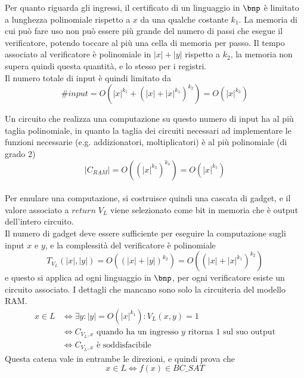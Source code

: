 Per quanto riguarda gli ingressi, il certificato di un linguaggio in $\bnp$ è limitato a lunghezza polinomiale rispetto a $x$ da una qualche costante $k_1$. La memoria di cui può fare uso non può essere più grande del numero di passi che esegue il verificatore, potendo toccare al più una cella di memoria per passo.
Il tempo associato al verificatore è polinomiale in $|x|+|y|$ rispetto a $k_2$, la memoria non supera quindi questa quantità, e lo stesso per i registri.
\\
Il numero totale di input è quindi limitato da
\begin{equation*}
    \# input =
    O \left( |x|^{k_1} + \left( |x|+|x|^{k_1} \right)^{k_2} \right)
    =
    O \left( |x|^{k_3} \right)
\end{equation*}

Un circuito che realizza una computazione su questo numero di input ha al più taglia polinomiale, in quanto la taglia dei circuiti necessari ad implementare le funzioni necessarie (e.g. addizionatori, moltiplicatori) è al più polinomiale (di grado 2)
\begin{equation*}
    |C_{RAM}| =
    O
    \left( 
        \left( |x|^{k_3} \right)^{k_4}
    \right)
    =
    O \left( |x|^{k_5} \right)
\end{equation*}
\\
Per emulare una computazione, si costruisce quindi una cascata di gadget, e il valore associato a $return \; V_L$ viene selezionato come bit in memoria che è output dell'intero circuito.
\\
Il numero di gadget deve essere sufficiente per eseguire la computazione sugli input $x$ e $y$, e la complessità del verificatore è polinomiale
\begin{equation*}
    T_{V_{L}} (|x|, |y|) = O \left( \left( |x|+|y| \right)^{k_{2}} \right) = 
    O \left( \left( |x|+|x|^{k_1} \right)^{k_2} \right)
\end{equation*}
e questo si applica ad ogni linguaggio in $\bnp$, per ogni verificatore esiste un circuito associato. I dettagli che mancano sono solo la circuiteria del modello RAM.
\begin{align*}
    x \in L
    &\Leftrightarrow
    \exists y : |y| = O \left( |x|^{k_1} \right) : V_L (x,y) = 1 
    \\
    &\Leftrightarrow 
    C_{V_L, x} \text{ quando ha un ingresso $y$ ritorna $1$ sul suo output}
    \\
    &\Leftrightarrow 
    C_{V_L, x} \text{ è soddisfacibile}
\end{align*}
Questa catena vale in entrambe le direzioni, e quindi prova che
\begin{equation*}
    x \in L \Leftrightarrow f(x) \in BC\_SAT
\end{equation*}

